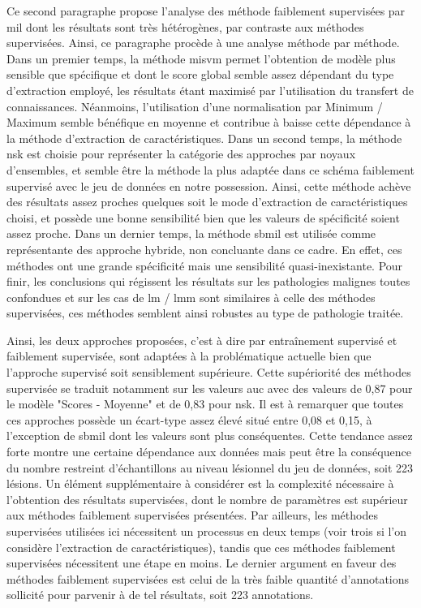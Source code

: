 Ce second paragraphe propose l'analyse des méthode faiblement supervisées par \gls{mil} dont les résultats sont très hétérogènes, par contraste aux méthodes supervisées. Ainsi, ce paragraphe procède à une analyse méthode par méthode. Dans un premier temps, la méthode \gls{misvm} permet l'obtention de modèle plus sensible que spécifique et dont le score global semble assez dépendant du type d'extraction employé, les résultats étant maximisé par l'utilisation du transfert de connaissances. Néanmoins, l'utilisation d'une normalisation par Minimum / Maximum semble bénéfique en moyenne et contribue à baisse cette dépendance à la méthode d'extraction de caractéristiques. Dans un second temps, la méthode \gls{nsk} est choisie pour représenter la catégorie des approches par noyaux d'ensembles, et semble être la méthode la plus adaptée dans ce schéma faiblement supervisé avec le jeu de données en notre possession. Ainsi, cette méthode achève des résultats assez proches quelques soit le mode d'extraction de caractéristiques choisi, et possède une bonne sensibilité bien que les valeurs de spécificité soient assez proche. Dans un dernier temps, la méthode \gls{sbmil} est utilisée comme représentante des approche hybride, non concluante dans ce cadre. En effet, ces méthodes ont une grande spécificité mais une sensibilité quasi-inexistante. Pour finir, les conclusions qui régissent les résultats sur les pathologies malignes toutes confondues et sur les cas de \gls{lm} / \gls{lmm} sont similaires à celle des méthodes supervisées, ces méthodes semblent ainsi robustes au type de pathologie traitée.\par

Ainsi, les deux approches proposées, c'est à dire par entraînement supervisé et faiblement supervisée, sont adaptées à la problématique actuelle bien que l'approche supervisé soit sensiblement supérieure. Cette supériorité des méthodes supervisée se traduit notamment sur les valeurs \gls{auc} avec des valeurs de 0,87 pour le modèle "Scores - Moyenne" et de 0,83 pour \gls{nsk}. Il est à remarquer que toutes ces approches possède un écart-type assez élevé situé entre 0,08 et 0,15, à l'exception de \gls{sbmil} dont les valeurs sont plus conséquentes. Cette tendance assez forte montre une certaine dépendance aux données mais peut être la conséquence du nombre restreint d'échantillons au niveau lésionnel du jeu de données, soit 223 lésions. Un élément supplémentaire à considérer est la complexité nécessaire à l'obtention des résultats supervisées, dont le nombre de paramètres est supérieur aux méthodes faiblement supervisées présentées. Par ailleurs, les méthodes supervisées utilisées ici nécessitent un processus en deux temps (voir trois si l'on considère l'extraction de caractéristiques), tandis que ces méthodes faiblement supervisées nécessitent une étape en moins. Le dernier argument en faveur des méthodes faiblement supervisées est celui de la très faible quantité d'annotations sollicité pour parvenir à de tel résultats, soit 223 annotations.\par

